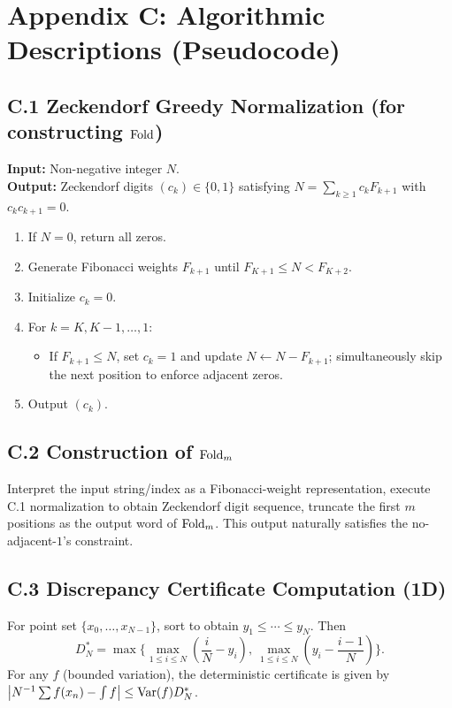 \section{Appendix C: Algorithmic Descriptions (Pseudocode)}

\subsection{C.1 Zeckendorf Greedy Normalization (for constructing $\mathrm{Fold}$)}

\textbf{Input:} Non-negative integer $N$. \\
\textbf{Output:} Zeckendorf digits $(c_k)\in\{0,1\}$ satisfying $N=\sum_{k\ge1}c_kF_{k+1}$ with $c_kc_{k+1}=0$.

\begin{enumerate}
  \item If $N=0$, return all zeros.
  \item Generate Fibonacci weights $F_{k+1}$ until $F_{K+1}\le N<F_{K+2}$.
  \item Initialize $c_k=0$.
  \item For $k=K,K-1,\dots,1$:
  \begin{itemize}
    \item If $F_{k+1}\le N$, set $c_k=1$ and update $N\leftarrow N-F_{k+1}$; simultaneously skip the next position to enforce adjacent zeros.
  \end{itemize}
  \item Output $(c_k)$.
\end{enumerate}

\subsection{C.2 Construction of $\mathrm{Fold}_m$}

Interpret the input string/index as a Fibonacci-weight representation, execute C.1 normalization to obtain Zeckendorf digit sequence, truncate the first $m$ positions as the output word of $\mathrm{Fold}_m$. This output naturally satisfies the no-adjacent-$1$'s constraint.

\subsection{C.3 Discrepancy Certificate Computation (1D)}

For point set $\{x_0,\dots,x_{N-1}\}$, sort to obtain $y_1\le\cdots\le y_N$. Then
\[
D_N^*=\max\Big\{\max_{1\le i\le N}\left(\frac{i}{N}-y_i\right),\ \max_{1\le i\le N}\left(y_i-\frac{i-1}{N}\right)\Big\}.
\]
For any $f$ (bounded variation), the deterministic certificate is given by $\big|N^{-1}\sum f(x_n)-\int f\big|\le\mathrm{Var}(f)D_N^*$.

